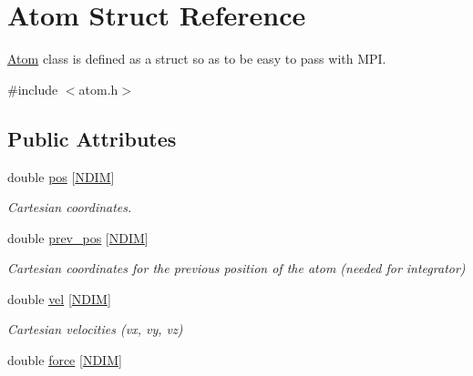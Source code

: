 \hypertarget{structAtom}{\section{Atom Struct Reference}
\label{structAtom}
}


\hyperlink{structAtom}{Atom} class is defined as a struct so as to be easy to pass with M\-P\-I.  




{\ttfamily \#include $<$atom.\-h$>$}

\subsection*{Public Attributes}
\begin{DoxyCompactItemize}
\item 
\hypertarget{structAtom_a99bc3071c5e17dd454c6257dce692a2a}{double \hyperlink{structAtom_a99bc3071c5e17dd454c6257dce692a2a}{pos} \mbox{[}\hyperlink{global_8h_ac92befc9e919a4caa991cbddc2455f6a}{N\-D\-I\-M}\mbox{]}}\label{structAtom_a99bc3071c5e17dd454c6257dce692a2a}

\begin{DoxyCompactList}\small\item\em Cartesian coordinates. \end{DoxyCompactList}\item 
\hypertarget{structAtom_a5ab233568e9091c7acdfef42efcd933c}{double \hyperlink{structAtom_a5ab233568e9091c7acdfef42efcd933c}{prev\-\_\-pos} \mbox{[}\hyperlink{global_8h_ac92befc9e919a4caa991cbddc2455f6a}{N\-D\-I\-M}\mbox{]}}\label{structAtom_a5ab233568e9091c7acdfef42efcd933c}

\begin{DoxyCompactList}\small\item\em Cartesian coordinates for the previous position of the atom (needed for integrator) \end{DoxyCompactList}\item 
\hypertarget{structAtom_afe6686a5403e25e7fe0e64f6623547ba}{double \hyperlink{structAtom_afe6686a5403e25e7fe0e64f6623547ba}{vel} \mbox{[}\hyperlink{global_8h_ac92befc9e919a4caa991cbddc2455f6a}{N\-D\-I\-M}\mbox{]}}\label{structAtom_afe6686a5403e25e7fe0e64f6623547ba}

\begin{DoxyCompactList}\small\item\em Cartesian velocities (vx, vy, vz) \end{DoxyCompactList}\item 
\hypertarget{structAtom_afcf18b786e37ff87a7d781c5e333ef40}{double \hyperlink{structAtom_afcf18b786e37ff87a7d781c5e333ef40}{force} \mbox{[}\hyperlink{global_8h_ac92befc9e919a4caa991cbddc2455f6a}{N\-D\-I\-M}\mbox{]}}\label{structAtom_afcf18b786e37ff87a7d781c5e333ef40}


\end{DoxyCompactItemize}
